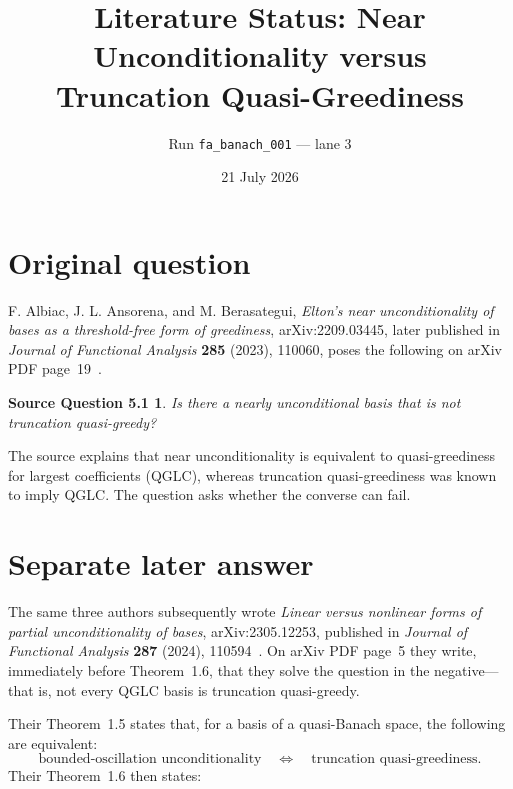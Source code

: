 \documentclass[11pt]{article}
\title{Literature Status: Near Unconditionality versus\\
Truncation Quasi-Greediness}
\author{Run \texttt{fa\_banach\_001} --- lane 3}
\date{21 July 2026}
\newtheorem*{question}{Source Question 5.1}
\begin{document}
\maketitle

\begin{center}
\end{center}

\section{Original question}

F. Albiac, J. L. Ansorena, and M. Berasategui,
\emph{Elton's near unconditionality of bases as a threshold-free form of
greediness}, arXiv:2209.03445, later published in
\emph{Journal of Functional Analysis} \textbf{285} (2023), 110060,
poses the following on arXiv PDF page~19~\cite{source}.

\begin{question}
Is there a nearly unconditional basis that is not truncation quasi-greedy?
\end{question}

The source explains that near unconditionality is equivalent to
quasi-greediness for largest coefficients (QGLC), whereas truncation
quasi-greediness was known to imply QGLC.  The question asks whether the
converse can fail.

\section{Separate later answer}

The same three authors subsequently wrote
\emph{Linear versus nonlinear forms of partial unconditionality of bases},
arXiv:2305.12253, published in \emph{Journal of Functional Analysis}
\textbf{287} (2024), 110594~\cite{answerpaper}.  On arXiv PDF page~5 they
write, immediately before Theorem~1.6, that they solve the question in the
negative---that is, not every QGLC basis is truncation quasi-greedy.

Their Theorem~1.5 states that, for a basis of a quasi-Banach space, the
following are equivalent:
\[
 \text{bounded-oscillation unconditionality}
 \quad\Longleftrightarrow\quad
 \text{truncation quasi-greediness}.
\]
Their Theorem~1.6 then states:
\end{document}
